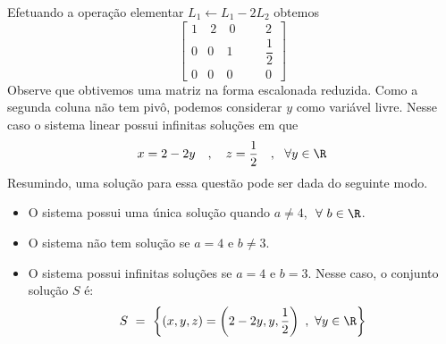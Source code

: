 \begin{solution}
Efetuando a operação elementar $L_1 \leftarrow L_1 - 2L_2$ obtemos
$$ \left[\begin{array}{rrrr|rc}
  1 & \ 2 &  \ 0 & & &   2             \\[5pt]
  0 &   0 &    1 & & &   \dfrac{1}{2}  \\[9pt] 
  0 &   0 &    0 & & &   0             \end{array}\right] $$
Observe que obtivemos uma matriz na forma escalonada reduzida. Como a segunda coluna não tem pivô, podemos considerar $y$ como variável livre.
Nesse caso o sistema linear possui infinitas soluções em que
$$x=2-2y\ \ \ ,\ \ \ z=\dfrac{1}{2} \ \ \ ,\ \ \forall y \in \R$$
Resumindo, uma solução para essa questão pode ser dada do seguinte modo.
\begin{itemize}
\item[(a)] O sistema possui uma única solução quando $a \neq 4$, $\ \forall\ b \in \R$.
\item[(b)] O sistema não tem solução se $a=4$ e $b\neq 3$.
\item[(c)] O sistema possui infinitas soluções se $a=4$ e $b=3$. Nesse caso, o conjunto solução $S$ é:
$$S\ =\ \biggl\{ (x,y,z) = \left(2-2y, y , \dfrac{1}{2}\right)\ ,\ \forall y \in \R \biggr\} $$
\end{itemize}
\end{solution}


